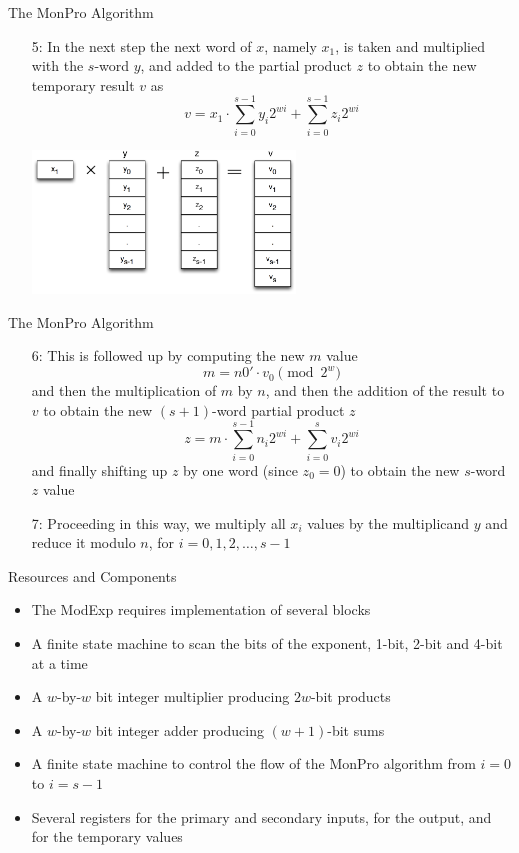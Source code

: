 \documentclass[xcolor=dvipsnames]{beamer}
\begin{document}
\begin{frame}{The MonPro Algorithm}
\begin{enumerate}

\item[5:] In the next step the next word of $x$, namely $x_1$, is taken and
multiplied with the $s$-word $y$, and added to the partial
product $z$ to obtain the new temporary result $v$ as
\[
v = x_1 \cdot \sum_{i=0}^{s-1} y_i 2^{wi} + \sum_{i=0}^{s-1} z_i 2^{wi}
\]

\centerline{\includegraphics[width=7cm]{mp5.eps}}

\end{enumerate}
\end{frame}

\begin{frame}{The MonPro Algorithm}
\begin{enumerate}

\item[6:] This is followed up by computing the new $m$ value
\[
m = n0' \cdot v_0 \pmod{2^w}
\]
and then the multiplication of $m$ by $n$, and then the addition of the
result to $v$ to obtain the new $(s+1)$-word partial product $z$
\[
z = m \cdot \sum_{i=0}^{s-1} n_i 2^{wi} + \sum_{i=0}^{s} v_i 2^{wi}
\]
and finally shifting up $z$ by one word (since $z_0=0$) to obtain
the new $s$-word $z$ value

\item[7:] Proceeding in this way, we multiply all $x_i$ values by the
multiplicand $y$ and reduce it modulo $n$, for $i=0,1,2,\ldots, s-1$

\end{enumerate}
\end{frame}

\begin{frame}{Resources and Components}
\begin{itemize}

\item The ModExp requires implementation of several blocks
\item A finite state machine to scan the bits of the exponent, 1-bit, 2-bit
and 4-bit at a time
\item A $w$-by-$w$ bit integer multiplier producing $2w$-bit products
\item A $w$-by-$w$ bit integer adder producing $(w+1)$-bit sums
\item A finite state machine to control the flow of the MonPro algorithm
from $i=0$ to $i=s-1$

\item Several registers for the primary and secondary inputs, for the output,
and for the temporary values

\end{itemize}
\end{frame}
\end{document}
